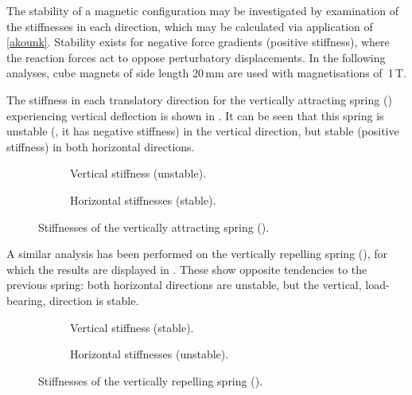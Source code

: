 The stability of a magnetic configuration may be investigated by
examination of the stiffnesses in each direction, which may be
calculated via application of \eqref{akounk}. Stability exists for
negative force gradients (positive stiffness), where the reaction
forces act to oppose perturbatory displacements. In the following
analyses, cube magnets of side length 20\,mm are used with
magnetisations of~1\,T.

The stiffness in each translatory direction for the vertically
attracting spring () experiencing vertical
deflection is shown in . It can be seen that this
spring is unstable (\ie, it has negative stiffness) in the vertical
direction, but stable (positive stiffness) in both horizontal
directions.

\begin{figure}[p]
  \begin{subfigure}
    \caption{Vertical stiffness (unstable).}
  \end{subfigure}
  \hfill
  \begin{subfigure}
    \caption{Horizontal stiffnesses (stable).}
  \end{subfigure}
  \caption{Stiffnesses of the vertically attracting spring ().}
\end{figure}

A similar analysis has been performed on the vertically repelling
spring (), for which the results are displayed
in . These show opposite tendencies to the previous
spring: both horizontal directions are unstable, but the vertical,
load-bearing, direction is stable.

\begin{figure}[p]
  \begin{subfigure}
    \caption{Vertical stiffness (stable).}
  \end{subfigure}
  \hfill
  \begin{subfigure}
    \caption{Horizontal stiffnesses (unstable).}
  \end{subfigure}
  \caption{Stiffnesses of the vertically repelling spring ().}
\end{figure}

